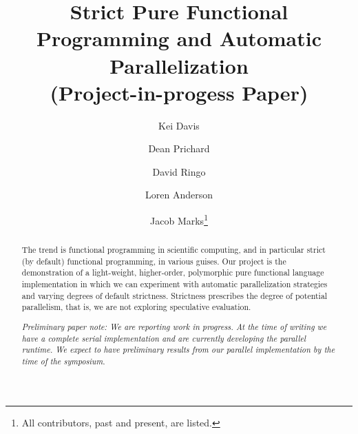 \documentclass{llncs}
\begin{document}
%
%
\pagestyle{headings}  %
%
%
\title{Strict Pure Functional Programming and Automatic Parallelization\\
       (Project-in-progess Paper)}
%
%
\author{Kei Davis \and 
        Dean Prichard \and 
        David Ringo \and
        Loren Anderson \and
        Jacob Marks\thanks{All contributors, past and present, are listed.}
}
%
%
%

\maketitle              %

\setcounter{footnote}{0}

\begin{abstract}
The trend is functional programming in scientific computing, and in particular
strict (by default) functional programming, in various guises.  Our project is
the demonstration of a light-weight, higher-order, polymorphic pure functional
language implementation in which we can experiment with automatic
parallelization strategies and varying degrees of default strictness.
Strictness prescribes the degree of potential parallelism, that is, we are not
exploring speculative evaluation.

\emph{Preliminary paper note: We are reporting work in progress.  At the time
  of writing we have a complete serial implementation and are currently
  developing the parallel runtime.  We expect to have preliminary results from
  our parallel implementation by the time of the symposium.}


\end{abstract}
\end{document}
